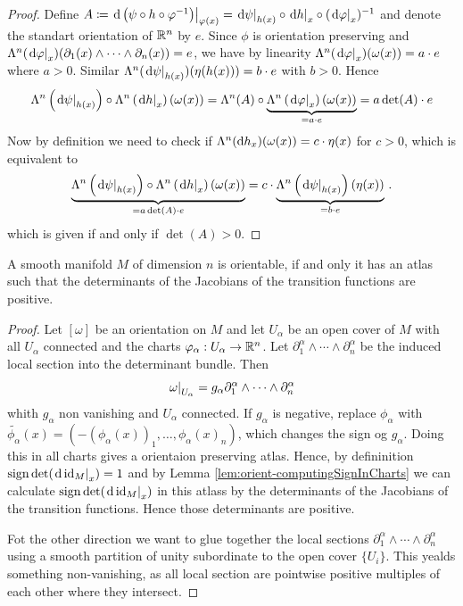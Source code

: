 \begin{proof}
    Define $A\coloneq \left.\mathop{}\!\mathrm{d}\left(\psi\circ h\circ \varphi^{-1}\right)\right|_{\varphi(x)}=\left.\mathop{}\!\mathrm{d} \psi\right|_{h(x)}\circ \left.\mathop{}\!\mathrm{d} h\right|_{x}\circ (\left.\mathop{}\!\mathrm{d} \varphi\right|_{x})^{-1}$ and denote the standart orientation of $\mathbb{R}^n$ by $e$. Since $\phi$ is orientation preserving and $\Lambda^n(\left.\mathop{}\!\mathrm{d} \varphi\right|_{x})(\partial_1(x)\wedge\cdots\wedge\partial_n(x))=e$, we have by linearity $\Lambda^n(\left.\mathop{}\!\mathrm{d} \varphi\right|_{x})(\omega(x))=a\cdot e$ where $a>0$. Similar $\Lambda^n(\left.\mathop{}\!\mathrm{d} \psi\right|_{h(x)})(\eta(h(x)))=b\cdot e$ with $b>0$. Hence
    \begin{equation*}
        \Lambda^n\left(\left.\mathop{}\!\mathrm{d} \psi\right|_{h(x)}\right)\circ \Lambda^n\left(\left.\mathop{}\!\mathrm{d} h\right|_{x}\right)(\omega(x))
        =\Lambda^n(A)\circ \underbrace{\Lambda^n\left(\left.\mathop{}\!\mathrm{d} \varphi\right|_{x}\right)(\omega(x))}_{=a\cdot e}=a \det(A)\cdot e
    \end{equation*} Now by definition we need to check if $\Lambda^n(\mathop{}\!\mathrm{d} h_x)(\omega (x))=c\cdot \eta (x)$ for $c>0$, which is equivalent to 
    \begin{equation*}
       \underbrace{ \Lambda^n\left(\left.\mathop{}\!\mathrm{d} \psi\right|_{h(x)}\right)\circ \Lambda^n\left(\left.\mathop{}\!\mathrm{d} h\right|_{x}\right)(\omega(x))}_{=a \det(A)\cdot e}=c\cdot \underbrace{\Lambda^n\left(\left.\mathop{}\!\mathrm{d} \psi\right|_{h(x)}\right)(\eta (x))}_{=b\cdot e}\,.
    \end{equation*} which is given if and only if $\det(A)>0$.
\end{proof}
\begin{corollary}\label{cor:orient-existsOrientationPreservingAtlas}
    A smooth manifold $M$ of dimension $n$ is orientable, if and only it has an atlas such that the determinants of the Jacobians of the transition functions are positive.
\end{corollary}
\begin{proof}
   Let $[\omega]$ be an orientation on $M$ and let $U_\alpha$ be an open cover of $M$ with all $U_\alpha$ connected and the charts $\varphi_\alpha:U_\alpha\to \mathbb{R}^n$. Let  $\partial_1^\alpha\wedge \cdots \wedge\partial_n^\alpha$ be the induced local section into the determinant bundle. Then 
   \begin{equation*}
   \left.\omega\right|_{U_\alpha}=g_\alpha \partial_1^\alpha\wedge \cdots \wedge\partial_n^\alpha
   \end{equation*} whith $g_\alpha$ non vanishing and $U_\alpha$ connected. If $g_\alpha$ is negative, replace $\phi_\alpha$ with $\tilde{\phi_\alpha}(x)=(-(\phi_\alpha(x))_1,\dots,\phi_\alpha(x)_n)$, which changes the sign og $g_\alpha$. Doing this in all charts gives a orientaion preserving atlas. Hence, by defininition $\mathrm{sign} \det(\left.\mathop{}\!\mathrm{d} \operatorname{\mathrm{id}}_M\right|_{x})=1$ and by Lemma \ref{lem:orient-computingSignInCharts} we can calculate $\mathrm{sign} \det(\left.\mathop{}\!\mathrm{d} \operatorname{\mathrm{id}}_M\right|_{x})$ in this atlass by the determinants of the Jacobians of the transition functions. Hence those determinants are positive.

 Fot the other direction we want to glue together the local sections $\partial_1^\alpha\wedge \cdots \wedge\partial_n^\alpha$ using a smooth partition of unity subordinate to the open cover $\{U_i\}$. This yealds something non-vanishing, as all local section are pointwise positive multiples of each other where they intersect. 
\end{proof}
